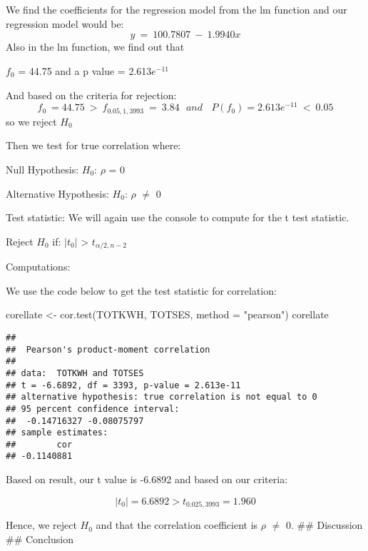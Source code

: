 \documentclass[
]{article}
\newenvironment{Shaded}{\begin{snugshade}}{\end{snugshade}}
\newcommand{\AttributeTok}[1]{\textcolor[rgb]{0.77,0.63,0.00}{#1}}
\newcommand{\FunctionTok}[1]{\textcolor[rgb]{0.00,0.00,0.00}{#1}}
\newcommand{\NormalTok}[1]{#1}
\newcommand{\OtherTok}[1]{\textcolor[rgb]{0.56,0.35,0.01}{#1}}
\newcommand{\StringTok}[1]{\textcolor[rgb]{0.31,0.60,0.02}{#1}}
\begin{document}
We find the coefficients for the regression model from the lm function
and our regression model would be: \[
  \hat{y} ~=~100.7807~-~1.9940x
\] Also in the lm function, we find out that

\(f_0\) = 44.75 and a p value = 2.613\(e^{-11}\)

And based on the criteria for rejection: \[
  f_0~=44.75~>~f_{0.05,1,3993}~=~3.84~~~and ~~~~P(f_0)=2.613e^{-11}~<~0.05
\] so we reject \(H_0\)

Then we test for true correlation where:

Null Hypothesis: \(H_0\): \(\rho\) = 0

Alternative Hypothesis: \(H_0\): \(\rho\) \(\ne\) 0

Test statistic: We will again use the console to compute for the t test
statistic.

Reject \(H_0\) if: \(|t_0|\) \textgreater{} \(t_{\alpha/2,n-2}\)

Computations:

We use the code below to get the test statistic for correlation:

\begin{Shaded}
\begin{Highlighting}[]
\NormalTok{corellate }\OtherTok{\textless{}{-}} \FunctionTok{cor.test}\NormalTok{(TOTKWH, TOTSES, }\AttributeTok{method =} \StringTok{"pearson"}\NormalTok{) }
\NormalTok{corellate}
\end{Highlighting}
\end{Shaded}

\begin{verbatim}
## 
##  Pearson's product-moment correlation
## 
## data:  TOTKWH and TOTSES
## t = -6.6892, df = 3393, p-value = 2.613e-11
## alternative hypothesis: true correlation is not equal to 0
## 95 percent confidence interval:
##  -0.14716327 -0.08075797
## sample estimates:
##        cor 
## -0.1140881
\end{verbatim}

Based on result, our t value is -6.6892 and based on our criteria:

\[
|t_0| = 6.6892 > t_{0.025,3993} = 1.960
\]

Hence, we reject \(H_0\) and that the correlation coefficient is
\(\rho\) \(\ne\) 0. \#\# Discussion \#\# Conclusion
\end{document}
